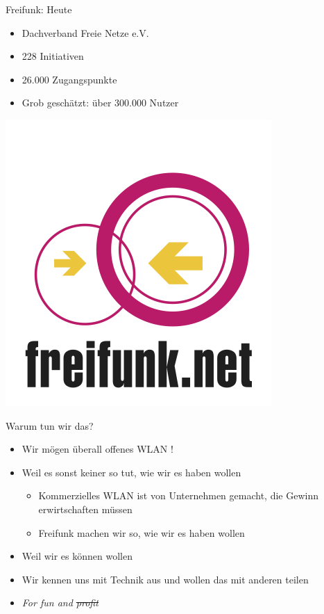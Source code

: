\documentclass[fleqn,11pt,aspectratio=169]{beamer}
\begin{document}
\begin{frame}{Freifunk: Heute}
	\begin{multicols*}{2}
	\begin{block}{}
  \begin{itemize}
		\item Dachverband Freie Netze e.V.
		\item 228 Initiativen
		\item 26.000 Zugangspunkte
		\item Grob geschätzt: über 300.000 Nutzer
	\end{itemize}
	\end{block}
	\centering
	\includegraphics[height=0.9\textheight]{freifunk.png}
	\end{multicols*}
\end{frame}

\begin{frame}{Warum tun wir das?}
\begin{itemize}
	\item Wir mögen überall offenes WLAN !
	\item Weil es sonst keiner so tut, wie wir es haben wollen
	\begin{itemize}
		\item Kommerzielles WLAN ist von Unternehmen gemacht, die Gewinn erwirtschaften müssen
		\item Freifunk machen wir so, wie wir es haben wollen
	\end{itemize}
	\item Weil wir es können wollen
	\item Wir kennen uns mit Technik aus und wollen das mit anderen teilen
	\item \textit{For fun and \sout{profit}}
\end{itemize}
\end{frame}
\end{document}
